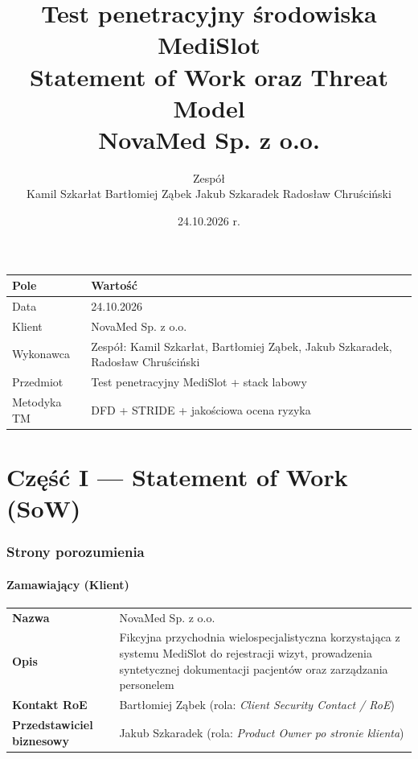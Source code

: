 \documentclass[11pt,a4paper]{article}
\title{\textbf{Test penetracyjny środowiska MediSlot}\\[0.3em]
\large Statement of Work oraz Threat Model\\[0.2em]
\normalsize NovaMed Sp. z o.o.}
\author{Zespół \\ Kamil Szkarłat \textbullet{} Bartłomiej Ząbek \textbullet{} Jakub Szkaradek \textbullet{} Radosław Chruściński}
\date{24.10.2026 r.}
\begin{document}
\maketitle
\thispagestyle{fancy}

\begin{center}
\begin{tabular}{@{}ll@{}}
\toprule
\textbf{Pole} & \textbf{Wartość} \\
\midrule
Data & 24.10.2026 \\
Klient & NovaMed Sp. z o.o. \\
Wykonawca & Zespół: Kamil Szkarłat, Bartłomiej Ząbek, Jakub Szkaradek, Radosław Chruściński \\
Przedmiot & Test penetracyjny MediSlot + stack labowy \\
Metodyka TM & DFD + STRIDE + jakościowa ocena ryzyka \\
\bottomrule
\end{tabular}
\end{center}

\vspace{1em}
\tableofcontents
\newpage

\part*{Część I — Statement of Work (SoW)}

\section{Strony porozumienia}

\subsection{Zamawiający (Klient)}

\begin{tabularx}{\textwidth}{@{}>{\bfseries}l L@{}}
\toprule
Nazwa & NovaMed Sp. z o.o. \\
Opis & Fikcyjna przychodnia wielospecjalistyczna korzystająca z systemu MediSlot do rejestracji wizyt, prowadzenia syntetycznej dokumentacji pacjentów oraz zarządzania personelem \\
Kontakt RoE & Bartłomiej Ząbek (rola: \emph{Client Security Contact / RoE}) \\
Przedstawiciel biznesowy & Jakub Szkaradek (rola: \emph{Product Owner po stronie klienta}) \\
\bottomrule
\end{tabularx}
\end{document}
